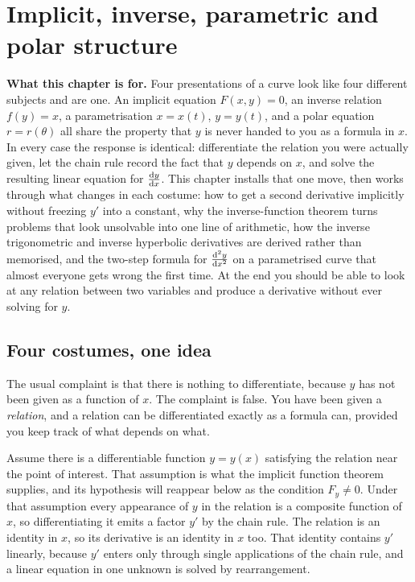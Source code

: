 \chapter{Implicit, inverse, parametric and polar structure}

\begin{orient}
\textbf{What this chapter is for.} Four presentations of a curve look like four different subjects and are one. An implicit equation $F(x,y)=0$, an inverse relation $f(y)=x$, a parametrisation $x=x(t)$, $y=y(t)$, and a polar equation $r=r(\theta)$ all share the property that $y$ is never handed to you as a formula in $x$. In every case the response is identical: differentiate the relation you were actually given, let the chain rule record the fact that $y$ depends on $x$, and solve the resulting linear equation for $\frac{\mathrm{d}y}{\mathrm{d}x}$. This chapter installs that one move, then works through what changes in each costume: how to get a second derivative implicitly without freezing $y'$ into a constant, why the inverse-function theorem turns problems that look unsolvable into one line of arithmetic, how the inverse trigonometric and inverse hyperbolic derivatives are derived rather than memorised, and the two-step formula for $\frac{\mathrm{d}^{2}y}{\mathrm{d}x^{2}}$ on a parametrised curve that almost everyone gets wrong the first time. At the end you should be able to look at any relation between two variables and produce a derivative without ever solving for $y$.
\end{orient}

\section{Four costumes, one idea}

The usual complaint is that there is nothing to differentiate, because $y$ has not been given as a function of $x$. The complaint is false. You have been given a \emph{relation}, and a relation can be differentiated exactly as a formula can, provided you keep track of what depends on what.

Assume there is a differentiable function $y=y(x)$ satisfying the relation near the point of interest. That assumption is what the implicit function theorem supplies, and its hypothesis will reappear below as the condition $F_{y}\neq0$. Under that assumption every appearance of $y$ in the relation is a composite function of $x$, so differentiating it emits a factor $y'$ by the chain rule. The relation is an identity in $x$, so its derivative is an identity in $x$ too. That identity contains $y'$ linearly, because $y'$ enters only through single applications of the chain rule, and a linear equation in one unknown is solved by rearrangement.

